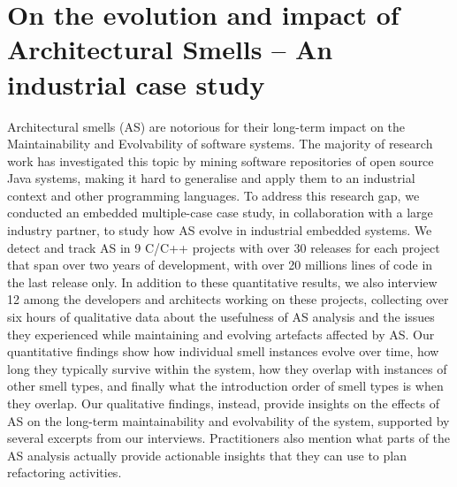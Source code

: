 \setlength{\headheight}{1.2cm}
\renewcommand{\publ}{\flushleft\footnotesize{Based on:\\[0.1cm]
		\textit{D. Sas, P. Avgeriou, and U. Uyumaz. "On the evolution and impact of architectural smells—an industrial case study." Empirical Software Engineering 27.4 (2022): 1-45.} \\[0.1cm]
}}

\chapter{On the evolution and impact of Architectural Smells -- An industrial case study}
\label{chap:4}

\begin{Abstract}
	Architectural smells (AS) are notorious for their  long-term impact on the Maintainability and Evolvability of software systems.
	The majority of research work has investigated this topic by mining software repositories of open source Java systems, making it hard to generalise and apply them to an industrial context and other programming languages.
	To address this research gap, we conducted an embedded multiple-case case study, in collaboration with a large industry partner, to study how AS evolve in industrial embedded systems.
	We detect and track AS in 9 C/C++ projects with over 30 releases for each project that span over two years of development, with over 20 millions lines of code in the last release only.
	In addition to these quantitative results, we also interview 12 among the developers and architects working on these projects, collecting over six hours of qualitative data about the usefulness of AS analysis and the issues they experienced while maintaining and evolving artefacts affected by AS.
	Our quantitative findings show how individual smell instances evolve over time, how long they typically survive within the system, how they overlap with instances of other smell types, and finally what the introduction order of smell types is when they overlap.
	Our qualitative findings, instead, provide insights on the effects of AS on the long-term maintainability and evolvability of the system, supported by several excerpts from our interviews. Practitioners also mention what parts of the AS analysis actually provide actionable insights that they can use to plan refactoring activities.
\end{Abstract}


